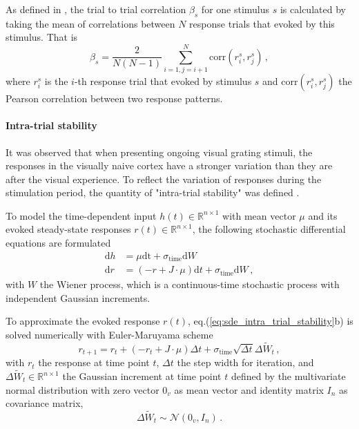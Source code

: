 \documentclass[11pt]{article}
\begin{document}
	As defined in \cite{tragenap2023nature}, the trial to trial correlation $\beta_s$ for one stimulus $s$ is calculated by taking the mean of correlations between $N$ response trials that evoked by this stimulus. That is
		\begin{equation} \label{eq:ttc_sym}
			\beta_s = \frac{2}{N(N-1)} \sum_{i = 1, j = i+1}^{N} \text{corr}(r_i^s, r_j^s) \, ,
		\end{equation}
	where $r_i^s$ is the $i$-th response trial that evoked by stimulus $s$ and $\text{corr}(r_i^s, r_j^s)$ the Pearson correlation between two response patterns. 
	
	\paragraph{Intra-trial stability}
	
	It was observed that when presenting ongoing visual grating stimuli, the responses in the visually naive cortex have a stronger variation than they are after the visual experience. To reflect the variation of responses during the stimulation period, the quantity of "intra-trial stability" was defined \cite{tragenap2023nature}. 
	
	To model the time-dependent input $h(t) \in \mathbb{R}^{n \times 1}$ with mean vector $\mu$ and its evoked steady-state responses $r(t) \in \mathbb{R}^{n \times 1}$, the following stochastic differential equations are formulated
		\begin{subequations} \label{eq:sde_intra_trial_stability}
			\begin{align}
				\mathrm{d} h & = \mu \mathrm{dt} + \sigma_{\text{time}} \mathrm{d} W \\
				\mathrm{d} r & = (-r + J \cdot \mu) \mathrm{d}t + \sigma_{\text{time}} \mathrm{d} W \, ,
			\end{align}
		\end{subequations}
	with $W$ the Wiener process, which is a continuous-time stochastic process with independent Gaussian increments. 
	
	To approximate the evoked response $r(t)$, eq.(\ref{eq:sde_intra_trial_stability}b) is solved numerically with Euler-Maruyama scheme 
		\begin{equation} \label{eq:euler_maruyama}
			r_{t+1} = r_t + (-r_t + J \cdot \mu) \Delta t + \sigma_{\text{time}} \sqrt{\Delta t} \Delta \tilde{W}_t \, ,
		\end{equation}
	with $r_t$ the response at time point $t$, $\Delta t$ the step width for iteration, and $\Delta \tilde{W}_t \in \mathbb{R}^{n \times 1}$ the Gaussian increment at time point $t$ defined by the multivariate normal distribution with zero vector $0_v$ as mean vector and identity matrix $I_n$ as covariance matrix, 
		\begin{equation}
			\Delta \tilde{W}_t \sim \mathcal{N}(0_v, I_n) \, .
		\end{equation}
	
\end{document}
